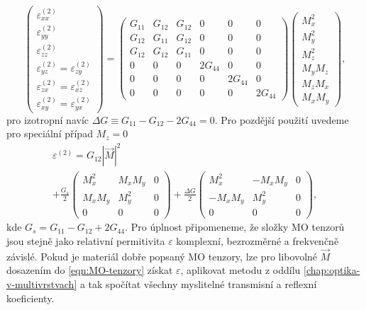 \begin{equation}
    \begin{pmatrix}
        \varepsilon^{(2)}_{xx} \\ \varepsilon^{(2)}_{yy} \\ \varepsilon^{(2)}_{zz} 
        \\ \varepsilon^{(2)}_{yz}=\varepsilon^{(2)}_{zy} 
        \\ \varepsilon^{(2)}_{zx}=\varepsilon^{(2)}_{xz} 
        \\ \varepsilon^{(2)}_{xy}=\varepsilon^{(2)}_{yx}
    \end{pmatrix}
    =\begin{pmatrix}
        G_{11} & G_{12} & G_{12} & 0 & 0 & 0 \\
        G_{12} & G_{11} & G_{12} & 0 & 0 & 0 \\
        G_{12} & G_{12} & G_{11} & 0 & 0 & 0 \\
        0 & 0 & 0 & 2G_{44} & 0 & 0 \\
        0 & 0 & 0 & 0 & 2G_{44} & 0 \\
        0 & 0 & 0 & 0 & 0 & 2G_{44}
    \end{pmatrix}
    \begin{pmatrix} M_x^2 \\ M_y^2 \\ M_z^2 \\ M_y M_z \\ M_z M_x \\ M_x M_y \end{pmatrix} ,
\end{equation}
pro izotropní navíc $\Delta G \equiv G_{11}-G_{12}-2G_{44}=0$.
Pro pozdější použití uvedeme pro speciální případ $M_z=0$
\begin{multline}
    \label{eqn:permitivita-kub-G-xy}
    \varepsilon^{(2)} = G_{12} |\vec{M}|^2 \\ 
    + \frac{G_s}{2} \begin{pmatrix}
        M_x^2 & M_x M_y & 0 \\ M_x M_y & M_y^2 & 0 \\ 0 & 0 & 0
    \end{pmatrix}
    + \frac{\Delta G}{2} \begin{pmatrix}
        M_x^2 & -M_xM_y & 0 \\ -M_xM_y & M_y^2 & 0 \\ 0 & 0 & 0
    \end{pmatrix} ,
\end{multline}
kde $G_s=G_{11}-G_{12}+2G_{44}$.
Pro úplnost připomeneme, že složky MO tenzorů jsou stejně jako relativní permitivita $\varepsilon$ komplexní, bezrozměrné a frekvenčně závislé.
Pokud je materiál dobře popsaný MO tenzory, lze pro libovolné $\vec{M}$ dosazením do \eqref{eqn:MO-tenzory} získat $\varepsilon$, aplikovat metodu z oddílu \ref{chap:optika-v-multivrstvach} a tak spočítat všechny myslitelné transmisní a reflexní koeficienty.


